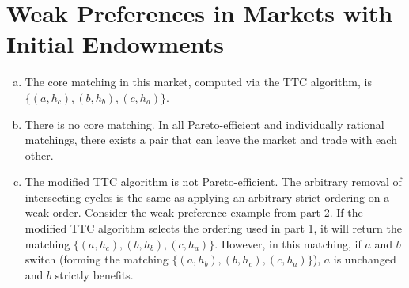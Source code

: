 \documentclass[12pt]{article}
\begin{document}
\section{Weak Preferences in Markets with Initial Endowments}
\begin{enumerate}[(a)]
\item The core matching in this market, computed via the TTC algorithm, is $\{(a, h_c), (b, h_b), (c, h_a)\}$.
\item There is no core matching. In all Pareto-efficient and individually rational matchings, there exists a pair that can leave the market and trade with each other.
\item The modified TTC algorithm is not Pareto-efficient. The arbitrary removal of intersecting cycles is the same as applying an arbitrary strict ordering on a weak order. Consider the weak-preference example from part 2. If the modified TTC algorithm selects the ordering used in part 1, it will return the matching $\{(a, h_c), (b, h_b), (c, h_a)\}$. However, in this matching, if $a$ and $b$ switch (forming the matching $\{(a, h_b), (b, h_c), (c, h_a)\}$), $a$ is unchanged and $b$ strictly benefits.
\end{enumerate}
\end{document}

